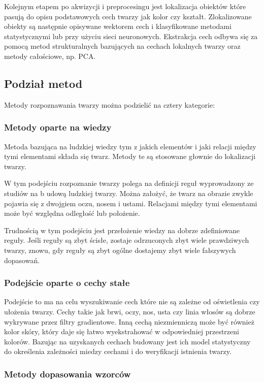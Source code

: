 \documentclass[11pt,a4paper]{article}
\begin{document}
Kolejnym etapem po akwizycji i preprocesingu jest lokalizacja obiektów które pasują do opisu podstawowych cech twarzy jak kolor czy kształt. Zlokalizowane obiekty są następnie opisywane wektorem cech i klasyfikowane metodami statystycznymi lub przy użyciu sieci neuronowych. Ekstrakcja cech odbywa się za pomocą metod strukturalnych bazujących na cechach lokalnych twarzy oraz metody całościowe, np. PCA.

\subsection{Podział metod}

Metody rozpoznawania twarzy można podzielić na cztery kategorie\cite{YANG001}:

\subsubsection{Metody oparte na wiedzy}

Metoda bazująca na ludzkiej wiedzy tym z jakich elementów i jaki relacji między tymi elementami składa się twarz. Metody te są stosowane głownie do lokalizacji twarzy.

W tym podejściu rozpoznanie twarzy polega na definicji reguł wyprowadzony ze studiów na b   udową ludzkiej twarzy. Można założyć, że twarz na obrazie zwykle pojawia się z dwojgiem oczu, nosem i ustami. Relacjami między tymi elementami może być względna odległość lub położenie.

Trudnością w tym podejściu jest przełożenie wiedzy na dobrze zdefiniowane reguły. Jeśli reguły są zbyt ścisłe, zostaje odrzuconych zbyt wiele prawdziwych twarzy, znowu, gdy reguły są zbyt ogólne dostajemy zbyt wiele fałszywych dopasowań.

\subsubsection{Podejście oparte o cechy stałe}

Podejście to ma na celu wyszukiwanie cech które nie są zależne od oświetlenia czy ułożenia twarzy. Cechy takie jak brwi, oczy, nos, usta czy linia włosów są dobrze wykrywane przez filtry gradientowe. Inną cechą niezmienniczą może być również kolor skóry, który daje się łatwo wyekstrahować w odpowiedniej przestrzeni kolorów. Bazując na uzyskanych cechach budowany jest ich model statystyczny do określenia zależności miedzy cechami i do weryfikacji istnienia twarzy.

\subsubsection{Metody dopasowania wzorców}
\end{document}
